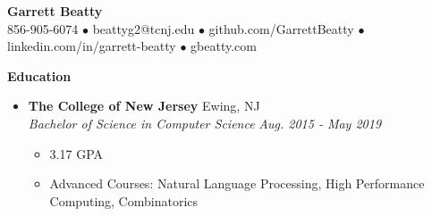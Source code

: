 \documentclass[letterpaper,10pt]{article}
\newcommand{\resitem}[1]{\item #1 \vspace{-2pt}}
\newcommand{\resheading}[1]{{\large \colorbox{mygrey}{\begin{minipage}{\textwidth}{\textbf{#1 \vphantom{p\^{E}}}}\end{minipage}}}}
\newcommand{\ressubheading}[4]{%
  \item\textbf{#1} \hfill #2\null\\
  \textit{#3} \hfill \textit{#4}%
  \vspace{-5pt}
}%
\begin{document}
\begin{center}
\textbf{\Huge Garrett Beatty} \\
\vspace{0.05in}
856-905-6074 $\bullet$ beattyg2@tcnj.edu $\bullet$ github.com/GarrettBeatty $\bullet$ linkedin.com/in/garrett-beatty $\bullet$ gbeatty.com
\end{center}

\vspace{-0.05in}

\resheading{Education}
\begin{itemize}

\ressubheading{The College of New Jersey}{Ewing, NJ}{Bachelor of Science in Computer Science}{Aug. 2015 - May 2019}
	\begin{itemize}
		\resitem {3.17 GPA}
		\resitem{Advanced Courses: Natural Language Processing, High Performance Computing, Combinatorics}
	\end{itemize}
\end{itemize}
\end{document}
